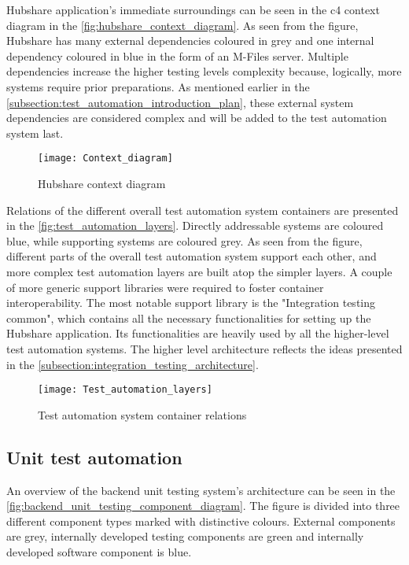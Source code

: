 Hubshare application's immediate surroundings can be seen in the \gls{c4} context diagram in the \autoref{fig:hubshare_context_diagram}. As seen from the figure, Hubshare has many external dependencies coloured in grey and one internal dependency coloured in blue in the form of an M-Files server. Multiple dependencies increase the higher testing levels complexity because, logically, more systems require prior preparations. As mentioned earlier in the \autoref{subsection:test_automation_introduction_plan}, these external system dependencies are considered complex and will be added to the test automation system last.

\begin{figure}
	\centering
	\texttt{[image: Context\_diagram]}
	\caption{Hubshare context diagram}
	\label{fig:hubshare_context_diagram}
\end{figure}

Relations of the different overall test automation system containers are presented in the \autoref{fig:test_automation_layers}. Directly addressable systems are coloured blue, while supporting systems are coloured grey. As seen from the figure, different parts of the overall test automation system support each other, and more complex test automation layers are built atop the simpler layers. A couple of more generic support libraries were required to foster container interoperability. The most notable support library is the "Integration testing common", which contains all the necessary functionalities for setting up the Hubshare application. Its functionalities are heavily used by all the higher-level test automation systems. The higher level architecture reflects the ideas presented in the \autoref{subsection:integration_testing_architecture}.

\begin{figure}
	\centering
	\texttt{[image: Test\_automation\_layers]}
	\caption{Test automation system container relations}
	\label{fig:test_automation_layers}
\end{figure}
\FloatBarrier

\subsection{Unit test automation}
An overview of the backend unit testing system's architecture can be seen in the \autoref{fig:backend_unit_testing_component_diagram}. The figure is divided into three different component types marked with distinctive colours. External components are grey, internally developed testing components are green and internally developed software component is blue.

